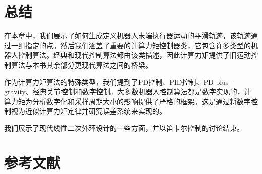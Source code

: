 \documentclass[UTF8]{ctexart}
\theoremstyle{definition}
\begin{document}
\section{总结}

在本章中，我们展示了如何生成定义机器人末端执行器运动的平滑轨迹，该轨迹通过一组指定的点。然后我们涵盖了重要的计算力矩控制器类，它包含许多类型的机器人控制算法。经典和现代控制算法都由该类描述，因此计算力矩提供了旧运动控制算法与本书其余部分更现代算法之间的桥梁。

作为计算力矩算法的特殊类型，我们提到了PD控制、PID控制、PD-plus-gravity、经典关节控制和数字控制。大多数机器人控制算法都是数字实现的，计算力矩为分析数字化和采样周期大小的影响提供了严格的框架。这是通过将数字控制视为近似计算力矩定律并研究误差系统来实现的。

我们展示了现代线性二次外环设计的一些方面，并以笛卡尔控制的讨论结束。

\newpage
\section*{参考文献}
\end{document}
